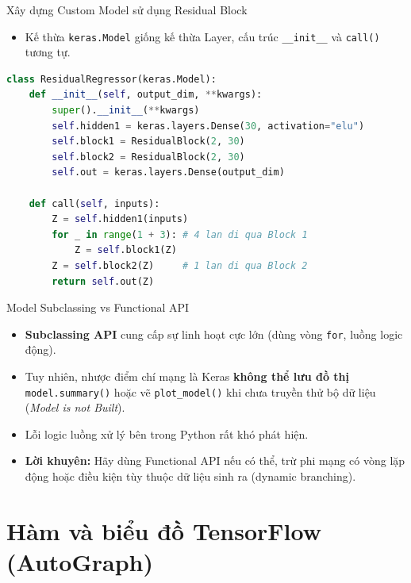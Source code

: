 \documentclass[aspectratio=169]{beamer}
\begin{document}
\begin{frame}[fragile]{Xây dựng Custom Model sử dụng Residual Block}
    \begin{itemize}
        \item Kế thừa \texttt{keras.Model} giống kế thừa Layer, cấu trúc \texttt{\_\_init\_\_} và \texttt{call()} tương tự.
    \end{itemize}
    \begin{lstlisting}[language=Python]
class ResidualRegressor(keras.Model):
    def __init__(self, output_dim, **kwargs):
        super().__init__(**kwargs)
        self.hidden1 = keras.layers.Dense(30, activation="elu")
        self.block1 = ResidualBlock(2, 30)
        self.block2 = ResidualBlock(2, 30)
        self.out = keras.layers.Dense(output_dim)

    def call(self, inputs):
        Z = self.hidden1(inputs)
        for _ in range(1 + 3): # 4 lan di qua Block 1
            Z = self.block1(Z)
        Z = self.block2(Z)     # 1 lan di qua Block 2
        return self.out(Z)
    \end{lstlisting}
\end{frame}

\begin{frame}{Model Subclassing vs Functional API}
    \begin{itemize}
        \item \textbf{Subclassing API} cung cấp sự linh hoạt cực lớn (dùng vòng \texttt{for}, luồng logic động). 
        \item Tuy nhiên, nhược điểm chí mạng là Keras \textbf{không thể lưu đồ thị} \texttt{model.summary()} hoặc vẽ \texttt{plot\_model()} khi chưa truyền thử bộ dữ liệu (\textit{Model is not Built}). 
        \item Lỗi logic luồng xử lý bên trong Python rất khó phát hiện.
        \item \textbf{Lời khuyên:} Hãy dùng Functional API nếu có thể, trừ phi mạng có vòng lặp động hoặc điều kiện tùy thuộc dữ liệu sinh ra (dynamic branching).
    \end{itemize}
\end{frame}

\section{Hàm và biểu đồ TensorFlow (AutoGraph)}
\end{document}
